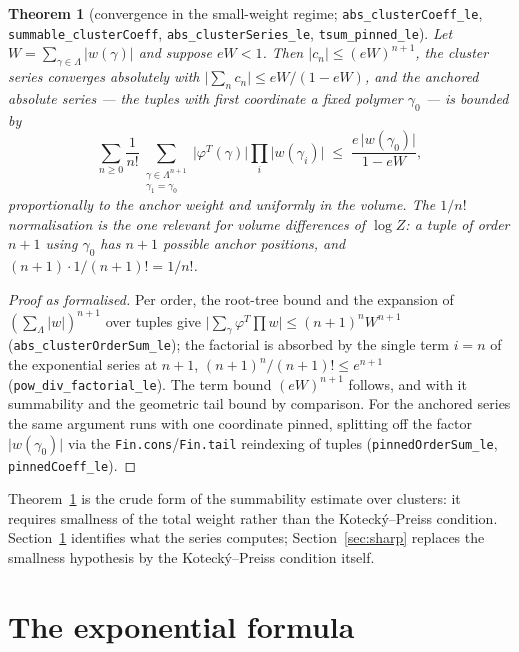 \documentclass[11pt]{amsart}
\newtheorem{theorem}{Theorem}[section]
\begin{document}
\begin{theorem}[convergence in the small-weight regime;
\texttt{abs\_clusterCoeff\_le}, \texttt{summable\_clusterCoeff},
\texttt{abs\_clusterSeries\_le}, \texttt{tsum\_pinned\_le}]
\label{thm:series}
Let $W = \sum_{\gamma \in \Lambda} \lvert w(\gamma) \rvert$ and suppose
$eW < 1$. Then $\lvert c_n \rvert \le (eW)^{n+1}$, the cluster series
converges absolutely with
$\lvert \sum_{n} c_n \rvert \le eW/(1 - eW)$, and the anchored absolute
series — the tuples with first coordinate a fixed polymer $\gamma_0$ —
is bounded by
\[
  \sum_{n \ge 0} \frac{1}{n!}
  \sum_{\substack{\gamma \in \Lambda^{n+1} \\ \gamma_1 = \gamma_0}}
  \lvert \varphi^{T}(\gamma) \rvert \prod_i \lvert w(\gamma_i) \rvert
  \;\le\; \frac{e \, \lvert w(\gamma_0) \rvert}{1 - eW},
\]
proportionally to the anchor weight and uniformly in the volume. The
$1/n!$ normalisation is the one relevant for volume differences of
$\log Z$: a tuple of order $n+1$ using $\gamma_0$ has $n+1$ possible
anchor positions, and $(n+1) \cdot 1/(n+1)! = 1/n!$.
\end{theorem}

\begin{proof}[Proof as formalised]
Per order, the root-tree bound and the expansion of
$(\sum_\Lambda \lvert w \rvert)^{n+1}$ over tuples give
$\lvert \sum_{\gamma} \varphi^{T} \prod w \rvert \le (n+1)^n W^{n+1}$
(\texttt{abs\_clusterOrderSum\_le}); the factorial is absorbed by the
single term $i = n$ of the exponential series at $n+1$,
$(n+1)^n/(n+1)! \le e^{n+1}$ (\texttt{pow\_div\_factorial\_le}). The
term bound $(eW)^{n+1}$ follows, and with it summability and the
geometric tail bound by comparison. For the anchored series the same
argument runs with one coordinate pinned, splitting off the factor
$\lvert w(\gamma_0) \rvert$ via the \texttt{Fin.cons}/\texttt{Fin.tail}
reindexing of tuples (\texttt{pinnedOrderSum\_le},
\texttt{pinnedCoeff\_le}).
\end{proof}

Theorem~\ref{thm:series} is the crude form of the summability estimate
over clusters: it requires smallness of the total weight rather than
the Kotecký--Preiss condition. Section~\ref{sec:exp} identifies what
the series computes; Section~\ref{sec:sharp} replaces the smallness
hypothesis by the Kotecký--Preiss condition itself.

\section{The exponential formula}\label{sec:exp}
\end{document}
